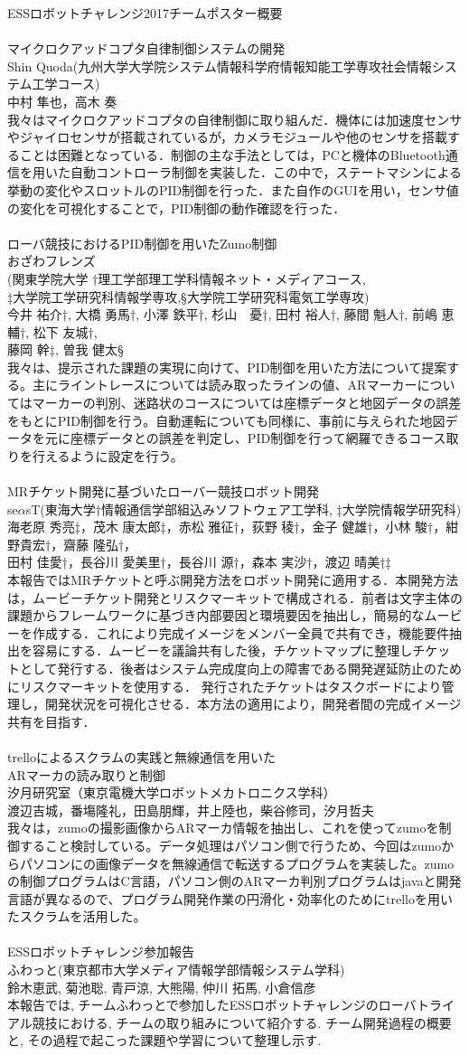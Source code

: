 \documentclass[xelatex,a4paper,ja=standard,jafont=hiragino-pron]{bxjsarticle}
\newcommand*{\team}[4]{\hrulefill\\{\Large #1}\vspace{0.5em}\\{#2}\\{#3}\vspace{0.5em}\\{#4}\vspace{1em}\\}
\begin{document}
{\huge \centering ESSロボットチャレンジ2017チームポスター概要}\\
%
\team{マイクロクアッドコプタ自律制御システムの開発}{Shin Quoda(九州大学大学院システム情報科学府情報知能工学専攻社会情報システム工学コース)}{中村 隼也，高木 奏}{我々はマイクロクアッドコプタの自律制御に取り組んだ．機体には加速度センサやジャイロセンサが搭載されているが，カメラモジュールや他のセンサを搭載することは困難となっている．制御の主な手法としては，PCと機体のBluetooth通信を用いた自動コントローラ制御を実装した．この中で，ステートマシンによる挙動の変化やスロットルのPID制御を行った．また自作のGUIを用い，センサ値の変化を可視化することで，PID制御の動作確認を行った．}    
%
\team{ローバ競技におけるPID制御を用いたZumo制御}{おざわフレンズ\\(関東学院大学 †理工学部理工学科情報ネット・メディアコース,\\‡大学院工学研究科情報学専攻,§大学院工学研究科電気工学専攻)}{今井 祐介†, 大橋 勇馬†, 小澤 鉄平†, 杉山　憂†, 田村 裕人†, 藤間 魁人†, 前嶋 恵輔†, 松下 友城†,\\藤岡 幹‡, 曽我 健太§}{我々は、提示された課題の実現に向けて、PID制御を用いた方法について提案する。主にライントレースについては読み取ったラインの値、ARマーカーについてはマーカーの判別、迷路状のコースについては座標データと地図データの誤差をもとにPID制御を行う。自動運転についても同様に、事前に与えられた地図データを元に座標データとの誤差を判定し、PID制御を行って網羅できるコース取りを行えるように設定を行う。}
%
\team{MRチケット開発に基づいたローバー競技ロボット開発}{se$\alpha$sT(東海大学†情報通信学部組込みソフトウェア工学科, ‡大学院情報学研究科)}{海老原 秀亮‡，茂木 康太郎‡，赤松 雅征†，荻野 稜†，金子 健雄†，小林 駿†，紺野貴宏†，齋藤 隆弘†，\\田村 佳愛†，長谷川 愛美里†，長谷川 源†，森本 実沙†，渡辺 晴美†‡}{本報告ではMRチケットと呼ぶ開発方法をロボット開発に適用する．本開発方法は，ムービーチケット開発とリスクマーキットで構成される．前者は文字主体の課題からフレームワークに基づき内部要因と環境要因を抽出し，簡易的なムービーを作成する．これにより完成イメージをメンバー全員で共有でき，機能要件抽出を容易にする．ムービーを議論共有した後，チケットマップに整理しチケットとして発行する．後者はシステム完成度向上の障害である開発遅延防止のためにリスクマーキットを使用する． 発行されたチケットはタスクボードにより管理し，開発状況を可視化させる．本方法の適用により，開発者間の完成イメージ共有を目指す．}
%
\newpage\team{trelloによるスクラムの実践と無線通信を用いた\\ARマーカの読み取りと制御}{汐月研究室（東京電機大学ロボットメカトロニクス学科）}{渡辺吉城，番塲隆礼，田島朋輝，井上陸也，柴谷修司，汐月哲夫}{我々は，zumoの撮影画像からARマーカ情報を抽出し、これを使ってzumoを制御すること検討している。データ処理はパソコン側で行うため、今回はzumoからパソコンにの画像データを無線通信で転送するプログラムを実装した。zumoの制御プログラムはC言語，パソコン側のARマーカ判別プログラムはjavaと開発言語が異なるので、プログラム開発作業の円滑化・効率化のためにtrelloを用いたスクラムを活用した。}
%
\team{ESSロボットチャレンジ参加報告}{ふわっと(東京都市大学メディア情報学部情報システム学科)}{鈴木恵武, 菊池聡, 青戸涼, 大熊陽, 仲川 拓馬, 小倉信彦}{本報告では, チームふわっとで参加したESSロボットチャレンジのローバトライアル競技における, チームの取り組みについて紹介する. チーム開発過程の概要と, その過程で起こった課題や学習について整理し示す.}
\end{document}
